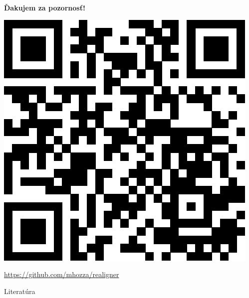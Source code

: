 \documentclass[xcolor=dvipsnames, compress, 12pt]{beamer}
\theoremstyle{definition}
\begin{document}
\begin{frame}[plain, c]
  \transdissolve[duration=5]
  \begin{center}
  \textbf{\color{Green} \LARGE Ďakujem za pozornosť!}

  \vspace{1cm}

  \includegraphics[width=.30\textwidth]{images/realigner}

  \vspace{.5cm}

  \url{https://github.com/mhozza/realigner}
  \end{center}


\end{frame}

\begin{frame}[allowframebreaks]{Literatúra}
  
  
\end{frame}
\end{document}
